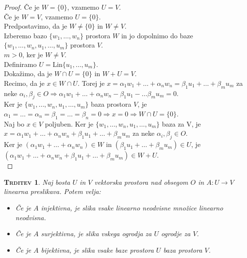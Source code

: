 \documentclass[a4paper,12pt]{article}
\newtheorem*{trditev}{\textsc{Trditev}}
\begin{document}
\begin{proof}
Če je $W=\{0\}$, vzamemo $U=V$. \\

Če je $W=V$, vzamemo $U=\{0\}$. \\

Predpostavimo, da je $W\neq \{0\}$ in $W\neq V$. \\

Izberemo bazo $\{w_1,\ldots,w_n\}$ prostora $W$ in jo dopolnimo do baze $\{w_1,\ldots,w_n,u_1,\ldots,u_m\}$ prostora $V$.\\

$m>0$, ker je $W\neq V$.\\

Definiramo $U=$Lin$\{u_1,\ldots,u_m\}$. \\

Dokažimo, da je $W\cap U=\{0\}$ in $W+U=V$.\\

Recimo, da je $x\in W \cap U$. Torej je $x=\alpha_1w_1+\ldots+\alpha_nw_n=\beta_1u_1+\ldots+\beta_mu_m$ za neke $\alpha_i,\beta_j\in O\Rightarrow \alpha_1w_1+\ldots+\alpha_nw_n-\beta_1u_1-\ldots\beta_mu_m=0$.\\

Ker je $\{w_1,\ldots,w_n,u_1,\ldots,u_m\}$ baza prostora $V$, je $\alpha_1=\ldots=\alpha_n=\beta_1=\ldots=\beta_n=0\Rightarrow x=0 \Rightarrow W \cap U=\{0\}$. \\

Naj bo $x\in V$ poljuben. Ker je $\{w_1,\ldots,w_n,u_1,\ldots,u_m\}$ baza za V, je  \linebreak 
$x=\alpha_1w_1+\ldots+\alpha_nw_n+\beta_1u_1+\ldots+\beta_mu_m$ za neke $\alpha_i,\beta_j\in O$. \\

Ker je $(\alpha_1w_1+\ldots+\alpha_nw_n)\in W$ in $(\beta_1u_1+\ldots+\beta_mu_m)\in U$, je \linebreak $(\alpha_1w_1+\ldots+\alpha_nw_n+\beta_1u_1+\ldots+\beta_mu_m)\in W+U$.\\
\end{proof}

\newpage 

\begin{trditev}
Naj bosta $U$ in $V$ vektorska prostora nad obsegom $O$ in $A:U\to V$ linearna preslikava. Potem velja:
\begin{itemize}
\item Če je $A$ injektivna, je slika vsake linearno neodvisne množice linearno neodvisna.
\item Če je $A$ surjektivna, je slika vskega ogrodja za $U$ ogrodje za $V$.
\item Če je $A$ bijektivna, je slika vsake baze prostora $U$ baza prostora $V$.\\
\end{itemize}
\end{trditev}
\end{document}
